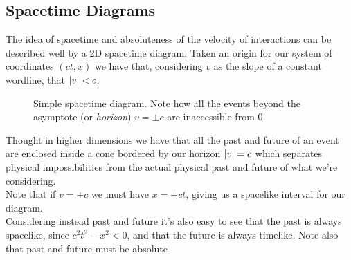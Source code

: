 \documentclass[../electromagnetism.tex]{subfiles}
\begin{document}
\subsection{Spacetime Diagrams}
The idea of spacetime and absoluteness of the velocity of interactions can be described well by a 2D spacetime diagram. Taken an origin for our system of coordinates $(ct,x)$ we have that, considering $v$ as the slope of a constant wordline, that $\abs{v}<c$.
\begin{figure}[H]
	\centering
	\caption{Simple spacetime diagram. Note how all the events beyond the asymptote (or \emph{horizon}) $v=\pm c$ are inaccessible from $0$}
	\label{fig:stdiag}
\end{figure}
Thought in higher dimensions we have that all the past and future of an event are enclosed inside a cone bordered by our horizon $\abs{v}=c$ which separates physical impossibilities from the actual physical past and future of what we're considering.\\
Note that if $v=\pm c$ we must have $x=\pm ct$, giving us a spacelike interval for our diagram.\\
Considering instead past and future it's also easy to see that the past is always spacelike, since $c^2t^2-x^2<0$, and that the future is always timelike. Note also that past and future must be absolute
\end{document}
